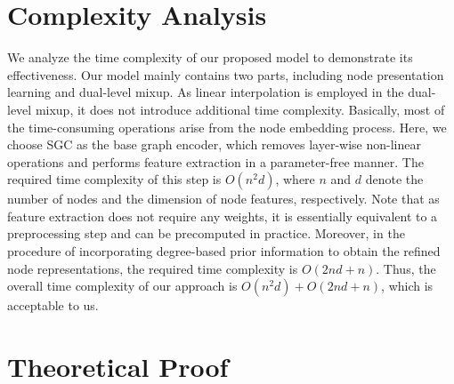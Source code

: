 \section{Complexity Analysis}
\label{complexity}
We analyze the time complexity of our proposed model to demonstrate its effectiveness. Our model mainly contains two parts, including node presentation learning and dual-level mixup. As linear interpolation is employed in the dual-level mixup, it does not introduce additional time complexity. Basically, most of the time-consuming operations arise from the node embedding process. Here, we choose SGC as the base graph encoder, which removes layer-wise non-linear operations and performs feature extraction in a parameter-free manner. The required time complexity of this step is $O(n^2d)$, where $n$ and $d$ denote the number of nodes and the dimension of node features, respectively. Note that as feature extraction does not require any weights, it is essentially equivalent to a preprocessing step and can be precomputed in practice. Moreover, in the procedure of incorporating degree-based prior information to obtain the refined node representations, the required time complexity is $O(2nd+n)$. Thus, the overall time complexity of our approach is $O(n^2d) + O(2nd+n)$, which is acceptable to us. %

\section{Theoretical Proof}
\label{proof}
